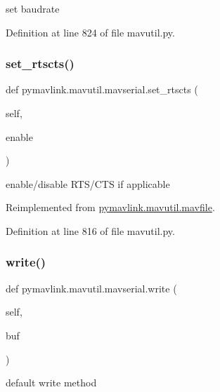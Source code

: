 \begin{DoxyVerb}set baudrate\end{DoxyVerb}
 

Definition at line 824 of file mavutil.\+py.

\mbox{\label{classpymavlink_1_1mavutil_1_1mavserial_af4a1da9b197ebf58110e26b805af1fda}} 
\subsubsection{\texorpdfstring{set\_rtscts()}{set\_rtscts()}}
{\footnotesize\ttfamily def pymavlink.\+mavutil.\+mavserial.\+set\+\_\+rtscts (\begin{DoxyParamCaption}\item[{}]{self,  }\item[{}]{enable }\end{DoxyParamCaption})}

\begin{DoxyVerb}enable/disable RTS/CTS if applicable\end{DoxyVerb}
 

Reimplemented from \mbox{\hyperlink{classpymavlink_1_1mavutil_1_1mavfile_a2607aae0fda1190034889d9e1c585539}{pymavlink.\+mavutil.\+mavfile}}.



Definition at line 816 of file mavutil.\+py.

\mbox{\label{classpymavlink_1_1mavutil_1_1mavserial_a6d0072efcfa0a49f95de45a8475b26e8}} 
\subsubsection{\texorpdfstring{write()}{write()}}
{\footnotesize\ttfamily def pymavlink.\+mavutil.\+mavserial.\+write (\begin{DoxyParamCaption}\item[{}]{self,  }\item[{}]{buf }\end{DoxyParamCaption})}

\begin{DoxyVerb}default write method\end{DoxyVerb}
 

